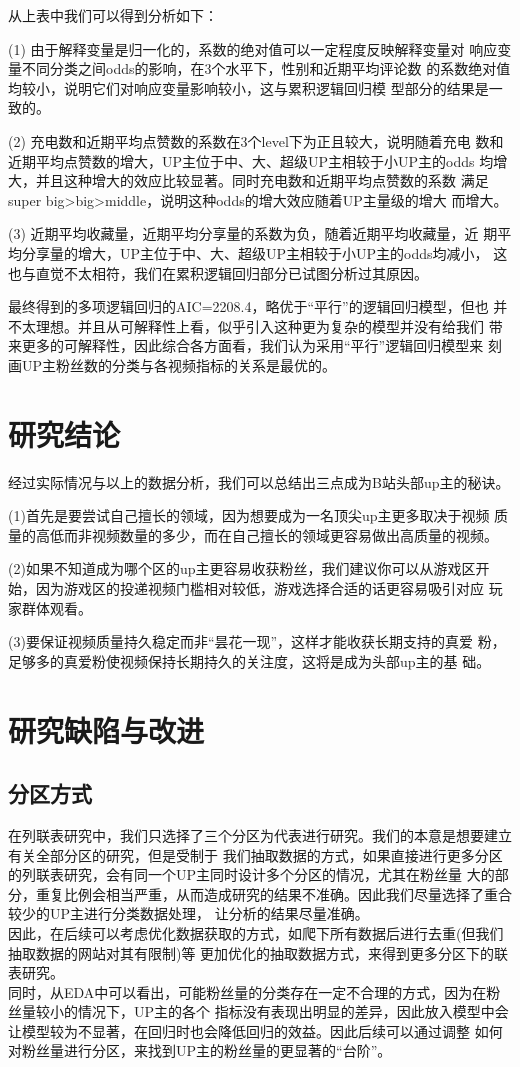 \documentclass{ctexart}
\begin{document}
从上表中我们可以得到分析如下：

(1) 由于解释变量是归一化的，系数的绝对值可以一定程度反映解释变量对
响应变量不同分类之间odds的影响，在3个水平下，性别和近期平均评论数
的系数绝对值均较小，说明它们对响应变量影响较小，这与累积逻辑回归模
型部分的结果是一致的。

(2) 充电数和近期平均点赞数的系数在3个level下为正且较大，说明随着充电
数和近期平均点赞数的增大，UP主位于中、大、超级UP主相较于小UP主的odds
均增大，并且这种增大的效应比较显著。同时充电数和近期平均点赞数的系数
满足super big>big>middle，说明这种odds的增大效应随着UP主量级的增大
而增大。

(3) 近期平均收藏量，近期平均分享量的系数为负，随着近期平均收藏量，近
期平均分享量的增大，UP主位于中、大、超级UP主相较于小UP主的odds均减小，
这也与直觉不太相符，我们在累积逻辑回归部分已试图分析过其原因。

最终得到的多项逻辑回归的AIC=2208.4，略优于“平行”的逻辑回归模型，但也
并不太理想。并且从可解释性上看，似乎引入这种更为复杂的模型并没有给我们
带来更多的可解释性，因此综合各方面看，我们认为采用“平行”逻辑回归模型来
刻画UP主粉丝数的分类与各视频指标的关系是最优的。

\section{研究结论}

经过实际情况与以上的数据分析，我们可以总结出三点成为B站头部up主的秘诀。

(1)首先是要尝试自己擅长的领域，因为想要成为一名顶尖up主更多取决于视频
质量的高低而非视频数量的多少，而在自己擅长的领域更容易做出高质量的视频。

(2)如果不知道成为哪个区的up主更容易收获粉丝，我们建议你可以从游戏区开
始，因为游戏区的投递视频门槛相对较低，游戏选择合适的话更容易吸引对应
玩家群体观看。

(3)要保证视频质量持久稳定而非“昙花一现”，这样才能收获长期支持的真爱
粉，足够多的真爱粉使视频保持长期持久的关注度，这将是成为头部up主的基
础。

\section{研究缺陷与改进}
\subsection{分区方式}
在列联表研究中，我们只选择了三个分区为代表进行研究。我们的本意是想要建立有关全部分区的研究，但是受制于
我们抽取数据的方式，如果直接进行更多分区的列联表研究，会有同一个UP主同时设计多个分区的情况，尤其在粉丝量
大的部分，重复比例会相当严重，从而造成研究的结果不准确。因此我们尽量选择了重合较少的UP主进行分类数据处理，
让分析的结果尽量准确。\\
\indent 因此，在后续可以考虑优化数据获取的方式，如爬下所有数据后进行去重(但我们抽取数据的网站对其有限制)等
更加优化的抽取数据方式，来得到更多分区下的联表研究。\\
\indent 同时，从EDA中可以看出，可能粉丝量的分类存在一定不合理的方式，因为在粉丝量较小的情况下，UP主的各个
指标没有表现出明显的差异，因此放入模型中会让模型较为不显著，在回归时也会降低回归的效益。因此后续可以通过调整
如何对粉丝量进行分区，来找到UP主的粉丝量的更显著的“台阶”。
\end{document}
